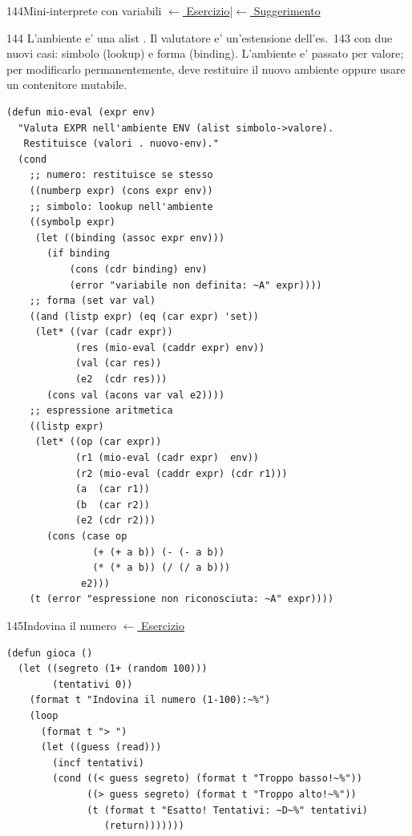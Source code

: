 \label{sol:144}
\begin{solbox}{144}{Mini-interprete con variabili}
\small\color{black!55}\hyperref[ex:144]{$\leftarrow$ Esercizio}\enspace\textcolor{black!30}{|}\enspace\hyperref[hint:144]{$\leftarrow$ Suggerimento}\normalsize\color{black}
\begin{ragionamentoBox}{144}
L'ambiente e' una alist .
Il valutatore e' un'estensione dell'es.~143 con due nuovi casi:
simbolo (lookup) e forma  (binding).
L'ambiente e' passato per valore; per modificarlo
permanentemente,  deve restituire il nuovo ambiente
oppure usare un contenitore mutabile.
\end{ragionamentoBox}
\begin{lstlisting}
(defun mio-eval (expr env)
  "Valuta EXPR nell'ambiente ENV (alist simbolo->valore).
   Restituisce (valori . nuovo-env)."
  (cond
    ;; numero: restituisce se stesso
    ((numberp expr) (cons expr env))
    ;; simbolo: lookup nell'ambiente
    ((symbolp expr)
     (let ((binding (assoc expr env)))
       (if binding
           (cons (cdr binding) env)
           (error "variabile non definita: ~A" expr))))
    ;; forma (set var val)
    ((and (listp expr) (eq (car expr) 'set))
     (let* ((var (cadr expr))
            (res (mio-eval (caddr expr) env))
            (val (car res))
            (e2  (cdr res)))
       (cons val (acons var val e2))))
    ;; espressione aritmetica
    ((listp expr)
     (let* ((op (car expr))
            (r1 (mio-eval (cadr expr)  env))
            (r2 (mio-eval (caddr expr) (cdr r1)))
            (a  (car r1))
            (b  (car r2))
            (e2 (cdr r2)))
       (cons (case op
               (+ (+ a b)) (- (- a b))
               (* (* a b)) (/ (/ a b)))
             e2)))
    (t (error "espressione non riconosciuta: ~A" expr))))
\end{lstlisting}
\end{solbox}


\label{sol:145}
\begin{solbox}{145}{Indovina il numero}
\small\color{black!55}\hyperref[ex:145]{$\leftarrow$ Esercizio}\normalsize\color{black}
\begin{lstlisting}
(defun gioca ()
  (let ((segreto (1+ (random 100)))
        (tentativi 0))
    (format t "Indovina il numero (1-100):~%")
    (loop
      (format t "> ")
      (let ((guess (read)))
        (incf tentativi)
        (cond ((< guess segreto) (format t "Troppo basso!~%"))
              ((> guess segreto) (format t "Troppo alto!~%"))
              (t (format t "Esatto! Tentativi: ~D~%" tentativi)
                 (return)))))))
\end{lstlisting}
\end{solbox}

